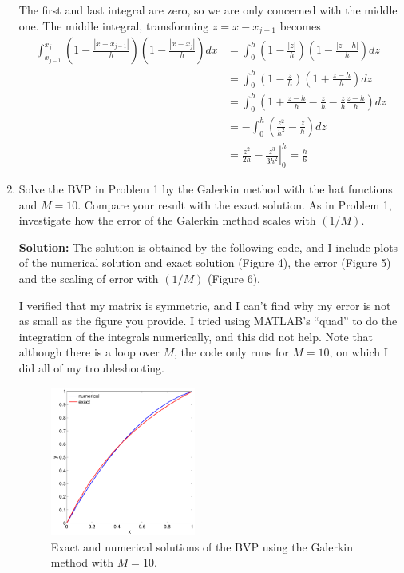 \documentclass[11pt]{article}
\def\f{\frac }
\begin{document}
\begin{enumerate}

The first and last integral are zero, so we are only concerned with the middle one.
The middle integral, transforming $z = x-x_{j-1}$ becomes
\begin{align*} \int _{x_{j-1}} ^{x_{j}} \left ( 1- \f{|x-x_{j-1}|}{h}\right ) \left (  1- \f{|x-x_{j}|}{h}\right ) dx &=  \int _{0} ^{h} \left ( 1- \f{|z|}{h}\right ) \left (  1- \f{|z-h|}{h}\right ) dz \\
&=  \int _{0} ^{h} \left ( 1- \f{z}{h}\right ) \left (  1+ \f{z-h}{h}\right ) dz \\
&=  \int _{0} ^{h}\left ( 1 + \f{z-h}{h} - \f{z}{h} - \f{z}{h}\f{z-h}{h}\right ) dz \\
&=  -\int _{0} ^{h} \left ( \f{z^2}{h^2}-\f{z}{h}\right ) dz \\
&=  \left. \f{z^2}{2h}-\f{z^3}{3h^2} \right | _{0} ^{h} = \f{h}{6} \end{align*}


\item Solve the BVP in Problem 1 by the Galerkin method with the hat functions and $M=10$.
Compare your result with the exact solution.
As in Problem 1, investigate how the error of the Galerkin method scales with $(1/M)$.

\bigskip
\textbf{Solution:} The solution is obtained by the following code, and I include plots of the numerical solution and exact solution (Figure 4), the error (Figure 5) and the scaling of error with $(1/M)$ (Figure 6).

I verified that my matrix is symmetric, and I can't find why my error is not as small as the figure you provide.
I tried using MATLAB's ``quad'' to do the integration of the integrals numerically, and this did not help.
Note that although there is a loop over $M$, the code only runs for $M=10$, on which I did all of my troubleshooting.



\begin{figure}[h!]
  \centering
    \includegraphics[width=0.45\textwidth]{andy_hw09_prb03_01_m10.pdf}
  \caption{Exact and numerical solutions of the BVP using the Galerkin method with $M=10$.}
\end{figure}


\end{enumerate}
\end{document}
